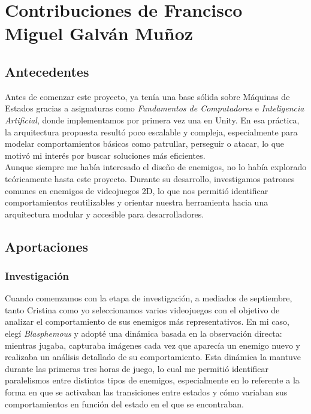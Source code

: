 \section*{Contribuciones de Francisco Miguel Galván Muñoz}
\subsection*{Antecedentes}
Antes de comenzar este proyecto, ya tenía una base sólida sobre Máquinas de Estados gracias a asignaturas como \textit{Fundamentos de Computadores} e \textit{Inteligencia Artificial}, donde implementamos por primera vez una en Unity. En esa práctica, la arquitectura propuesta resultó poco escalable y compleja, especialmente para modelar comportamientos básicos como patrullar, perseguir o atacar, lo que motivó mi interés por buscar soluciones más eficientes.\\

Aunque siempre me había interesado el diseño de enemigos, no lo había explorado teóricamente hasta este proyecto. Durante su desarrollo, investigamos patrones comunes en enemigos de videojuegos 2D, lo que nos permitió identificar comportamientos reutilizables y orientar nuestra herramienta hacia una arquitectura modular y accesible para desarrolladores.\\
 
\subsection*{Aportaciones}
\subsubsection*{Investigación}
Cuando comenzamos con la etapa de investigación, a mediados de septiembre, tanto Cristina como yo seleccionamos varios videojuegos con el objetivo de analizar el comportamiento de sus enemigos más representativos. En mi caso, elegí \textit{Blasphemous} y adopté una dinámica basada en la observación directa: mientras jugaba, capturaba imágenes cada vez que aparecía un enemigo nuevo y realizaba un análisis detallado de su comportamiento. Esta dinámica la mantuve durante las primeras tres horas de juego, lo cual me permitió identificar paralelismos entre distintos tipos de enemigos, especialmente en lo referente a la forma en que se activaban las transiciones entre estados y cómo variaban sus comportamientos en función del estado en el que se encontraban.\\


